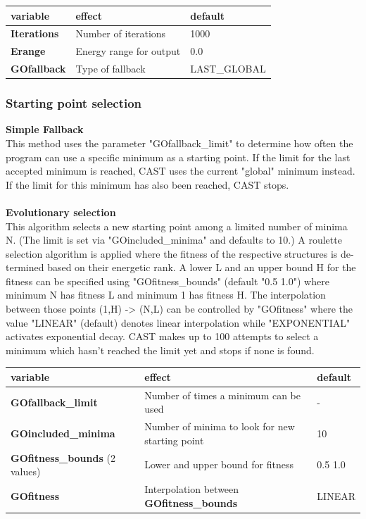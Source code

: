 \documentclass[10pt,a4paper]{article} %
\begin{document}
	\begin{tabularx}{\textwidth}{l|X|X}
		variable & effect & default \\
		\hline
		\textbf{Iterations} & Number of iterations & 1000 \\
		\textbf{Erange} & Energy range for output & 0.0 \\
		\textbf{GOfallback} & Type of fallback & LAST_GLOBAL \\
	\end{tabularx}

	\subsubsection{Starting point selection}
	\textbf{Simple Fallback} \\
	This method uses the parameter "GOfallback_limit" to determine how often the program can use a specific minimum as a starting point. If the limit for the last accepted minimum is reached, \ac{CAST} uses the current "global" minimum instead. If the limit for this minimum has also been reached, \ac{CAST} stops.\\~\\

	\textbf{Evolutionary selection} \\
	This algorithm selects a new starting point among a limited number of minima N. (The limit is set via "GOincluded_minima" and defaults to 10.)
	A roulette selection algorithm is applied where the fitness of the respective structures is de-termined based on their energetic rank. A lower L and an upper bound H for the fitness can be specified using "GOfitness_bounds" (default "0.5 1.0") where minimum N has fitness L and minimum 1 has fitness H.
	The interpolation between those points (1,H) -> (N,L) can be controlled by "GOfitness" where the value "LINEAR" (default) denotes linear interpolation while "EXPONENTIAL" activates exponential decay.
	\ac{CAST} makes up to 100 attempts to select a minimum which hasn’t reached the limit yet and stops if none is found.

	\begin{tabularx}{\textwidth}{l|X|X}
		variable & effect & default \\
		\hline
		\textbf{GOfallback_limit} & Number of times a minimum can be used & - \\
		\textbf{GOincluded_minima} & Number of minima to look for new starting point & 10 \\
		\textbf{GOfitness_bounds} (2 values) & Lower and upper bound for fitness & 0.5 1.0 \\
		\textbf{GOfitness} & Interpolation between \textbf{GOfitness_bounds} & LINEAR \\
	\end{tabularx}
	\\~\\
\end{document}
